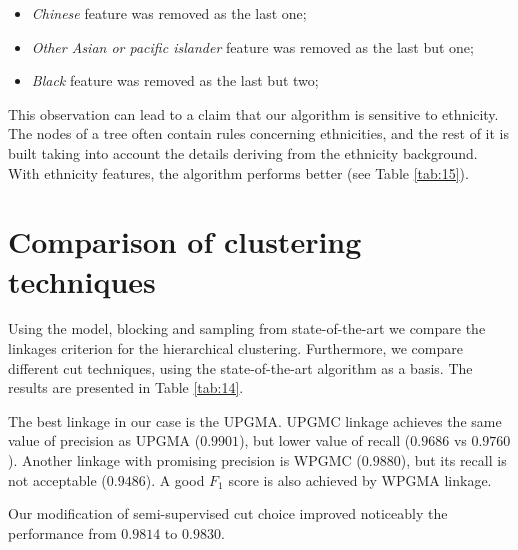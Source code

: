 \documentclass{pracamgr}
\begin{document}
\begin{itemize}
\item{\textit{Chinese} feature was removed as the last one;}
\item{\textit{Other Asian or pacific islander} feature was removed as the last but one;}
\item{\textit{Black} feature was removed as the last but two;}
\end{itemize}


This observation can lead to a claim that our algorithm is sensitive to ethnicity. The nodes
of a tree often contain rules concerning ethnicities,
and the rest of it is built taking into account the details deriving from the
ethnicity background. With ethnicity features, the algorithm performs better
(see Table \ref{tab:15}).

\section{Comparison of clustering techniques}
Using the model, blocking and sampling from state-of-the-art we compare the linkages
criterion for the hierarchical clustering. Furthermore, we compare different
cut techniques, using the state-of-the-art algorithm as a basis.
The results are presented in Table \ref{tab:14}.


The best linkage in our case is the UPGMA.
UPGMC linkage achieves the same value of precision  as UPGMA ($0.9901$), but 
lower value of recall ($0.9686$ vs $0.9760$). Another linkage with promising
precision is WPGMC ($0.9880$), but its recall is not acceptable ($0.9486$).
A good $F_{1}$ score is also achieved by WPGMA linkage.

Our modification of semi-supervised cut choice improved noticeably the performance
from $0.9814$ to $0.9830$.
\end{document}
